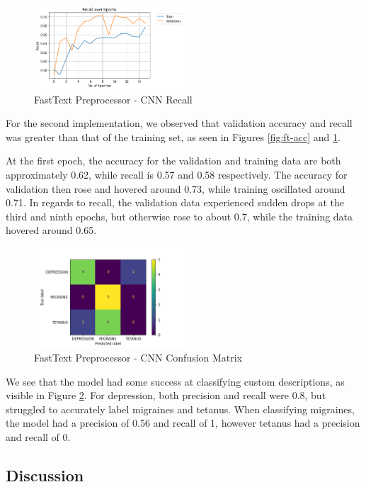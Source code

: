 \documentclass[12pt]{report}
\begin{document}
\begin{figure}[H]
	\centering
	\includegraphics[width=0.5\textwidth]{recall-1.png}
	\caption{FastText Preprocessor - CNN Recall}
	\label{fig:ft-rec}
\end{figure}

For the second implementation, we observed that validation accuracy and
recall was greater than that of the training set, as seen in Figures \ref{fig:ft-acc} and
\ref{fig:ft-rec}.

At the first epoch, the accuracy for the validation and training data are both
approximately 0.62, while recall is 0.57 and 0.58 respectively. The accuracy
for validation then rose and hovered around 0.73, while training oscillated
around 0.71. In regards to recall, the validation data experienced sudden drops
at the third and ninth epochs, but otherwise rose to about 0.7, while the
training data hovered around 0.65.

\begin{figure}[H]
	\centering
	\includegraphics[width=0.5\textwidth]{confusion_matrix_ft.png}
	\caption{FastText Preprocessor - CNN Confusion Matrix}
	\label{fig:ft-con}
\end{figure}

We see that the model had some success at classifying custom descriptions, as visible in 
Figure \ref{fig:ft-con}.
For depression, both precision and recall were 0.8, but struggled to accurately
label migraines and tetanus. When classifying migraines, the model had a
precision of 0.56 and recall of 1, however tetanus had a precision and recall of
0.

\subsection{Discussion}
\end{document}
